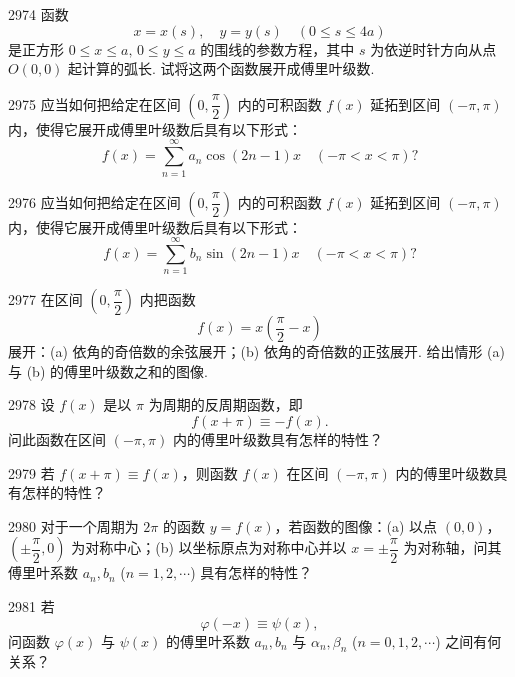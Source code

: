 \begin{prob}[M]{2974}
函数
\[
x = x(s), \quad y = y(s) \quad (0 \leqslant s \leqslant 4a)
\]
是正方形 $0 \leqslant x \leqslant a, \, 0 \leqslant y \leqslant a$ 的围线的参数方程，其中 $s$ 为依逆时针方向从点 $O(0,0)$ 起计算的弧长. 试将这两个函数展开成傅里叶级数.
\end{prob}

\begin{prob}[M]{2975}
应当如何把给定在区间 $\left(0, \dfrac{\pi}{2}\right)$ 内的可积函数 $f(x)$ 延拓到区间 $(-\pi, \pi)$ 内，使得它展开成傅里叶级数后具有以下形式：
\[
f(x) = \sum_{n=1}^{\infty} a_n \cos(2n-1)x \quad (-\pi < x < \pi)?
\]
\end{prob}

\begin{prob}[M]{2976}
应当如何把给定在区间 $\left(0, \dfrac{\pi}{2}\right)$ 内的可积函数 $f(x)$ 延拓到区间 $(-\pi, \pi)$ 内，使得它展开成傅里叶级数后具有以下形式：
\[
f(x) = \sum_{n=1}^{\infty} b_n \sin(2n-1)x \quad (-\pi < x < \pi)?
\]
\end{prob}

\begin{prob}[L]{2977}
在区间 $\left(0, \dfrac{\pi}{2}\right)$ 内把函数
\[
f(x) = x\left(\frac{\pi}{2} - x\right)
\]
展开：(a) 依角的奇倍数的余弦展开；(b) 依角的奇倍数的正弦展开. 给出情形 (a) 与 (b) 的傅里叶级数之和的图像.
\end{prob}

\begin{prob}[M]{2978}
设 $f(x)$ 是以 $\pi$ 为周期的反周期函数，即
\[
f(x + \pi) \equiv -f(x).
\]
问此函数在区间 $(-\pi, \pi)$ 内的傅里叶级数具有怎样的特性？
\end{prob}

\begin{prob}[M]{2979}
若 $f(x + \pi) \equiv f(x)$，则函数 $f(x)$ 在区间 $(-\pi, \pi)$ 内的傅里叶级数具有怎样的特性？
\end{prob}

\begin{prob}[M]{2980}
对于一个周期为 $2\pi$ 的函数 $y = f(x)$，若函数的图像：(a) 以点 $(0,0)$，$\left(\pm\dfrac{\pi}{2}, 0\right)$ 为对称中心；(b) 以坐标原点为对称中心并以 $x = \pm\dfrac{\pi}{2}$ 为对称轴，问其傅里叶系数 $a_n, b_n$ ($n = 1, 2, \cdots$) 具有怎样的特性？
\end{prob}

\begin{prob}[M]{2981}
若
\[
\varphi(-x) \equiv \psi(x),
\]
问函数 $\varphi(x)$ 与 $\psi(x)$ 的傅里叶系数 $a_n, b_n$ 与 $\alpha_n, \beta_n$ ($n = 0, 1, 2, \cdots$) 之间有何关系？
\end{prob}

